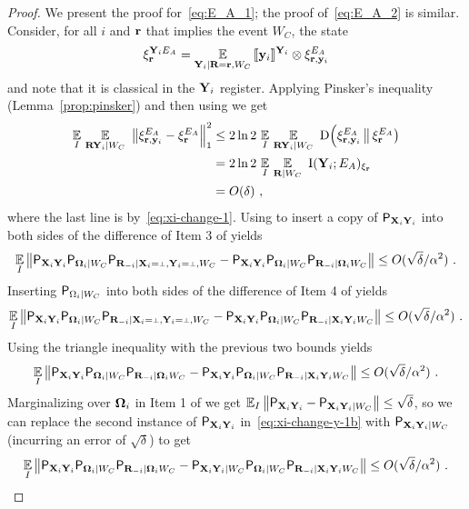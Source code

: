 \begin{proof}
We present the proof for~\eqref{eq:E_A_1}; the proof of~\eqref{eq:E_A_2} is similar. Consider, for all $i$ and $\br$ that implies the event $W_C$, the state
\[
	\xi_{\br}^{\bY_i E_A} = \Ex_{\bY_i | \bR = \br, W_C} \, \puretomixed{\by_i}^{\bY_i} \otimes \xi_{\br,\by_i}^{E_A}
\]
and note that it is classical in the $\bY_i$ register.
Applying Pinsker's inequality (Lemma~\ref{prop:pinsker}) and then using  we get
\begin{align}
\Ex_I \, \Ex_{\bR \bY_i | W_C} \,\, \big \| \xi^{E_A}_{\br,\by_i} -  \xi^{E_A}_{\br} \Big \|_1^2 &\leq 2  \ln 2 \, \Ex_I \,\Ex_{\bR \bY_i | W_C} \,\,  \D \Big(  \xi^{E_A}_{\br,\by_i} \, \big \|\, \xi^{E_A}_{\br} \big )\notag\\
&= 2\ln 2\, \Ex_I \, \Ex_{\bR | W_C} \,\,  \I (\bY_i ; E_A)_{\xi_\br} \notag\\
& = O(\delta)~,\label{eq:claim24-1a}
\end{align} 
where the last line is by~\eqref{eq:xi-change-1}. Using  to insert a copy of $\P_{\bX_i \bY_i}$ into both sides of the difference of Item 3 of  yields
\[
\Ex_I \left \|  \P_{\bX_i \bY_i} \P_{\bOmega_i | W_C} \P_{\bR_\mi | \bX_i = \dummy, \bY_i =\dummy,  W_C} - \P_{\bX_i \bY_i} \P_{\bOmega_i | W_C} \P_{\bR_\mi | \bOmega_i W_C} \right \| \leq O(\sqrt{\delta}/\alpha^2)~.
\]
Inserting $\P_{\Omega_i | W_C}$ into both sides of the difference of Item 4 of  yields
\[
\Ex_I \left \|  \P_{\bX_i \bY_i} \P_{\bOmega_i | W_C} \P_{\bR_\mi | \bX_i = \dummy, \bY_i =\dummy,  W_C} - \P_{\bX_i \bY_i} \P_{\bOmega_i | W_C} \P_{\bR_\mi | \bX_i \bY_i  W_C} \right \| \leq O(\sqrt{\delta}/\alpha^2)~.
\]
Using the triangle inequality with the previous two bounds yields
\begin{equation}
\label{eq:xi-change-y-1b}
\Ex_I \left \|  \P_{\bX_i \bY_i} \P_{\bOmega_i | W_C} \P_{\bR_\mi | \bOmega_i  W_C} - \P_{\bX_i \bY_i}  \P_{\bOmega_i | W_C} \P_{\bR_\mi | \bX_i \bY_i  W_C} \right \| \leq O(\sqrt{\delta}/\alpha^2)~.
\end{equation}
Marginalizing over $\bOmega_i$ in Item 1 of  we get $\Ex_I \left \| \P_{\bX_i \bY_i} - \P_{\bX_i \bY_i | W_C} \right \| \leq \sqrt{\delta}$, so we can replace the second instance of $\P_{\bX_i \bY_i}$ in~\eqref{eq:xi-change-y-1b} with $\P_{\bX_i \bY_i | W_C}$ (incurring an error of $\sqrt{\delta}$) to get
\[
\Ex_I \left \|  \P_{\bX_i \bY_i} \P_{\bOmega_i | W_C} \P_{\bR_\mi | \bOmega_i  W_C} - \P_{\bX_i \bY_i | W_C}  \P_{\bOmega_i | W_C} \P_{\bR_\mi | \bX_i \bY_i  W_C} \right \| \leq O(\sqrt{\delta}/\alpha^2)~.
\]
\end{proof}
